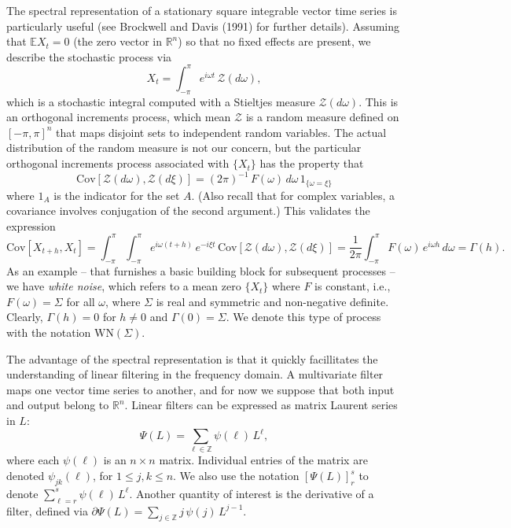 \documentclass[a4paper]{book}
\def\RR{\mathbb R}
\def\ZZ{\mathbb Z}
\def\EE{\mathbb E}
\begin{document}
 The spectral representation of a stationary square integrable vector 
time series is particularly useful (see Brockwell and Davis (1991) for 
 further details). Assuming that $\EE X_t = 0$ (the
 zero vector in $\RR^n$) so that no fixed effects are present, we describe
 the stochastic process via
\begin{equation}
\label{eq:specRep}
  X_t = \int_{-\pi}^{\pi} e^{i \omega t} \, \mathcal{Z} (d\omega),
\end{equation}
 which is a stochastic integral computed with a Stieltjes measure
 $\mathcal{Z} (d\omega)$.  This is an orthogonal increments process,
 which mean $\mathcal{Z}$ is a random measure defined on ${[-\pi,\pi]}^n$
 that maps disjoint sets to independent random variables.  The actual
 distribution of the random measure is not our concern, but the particular
 orthogonal increments process associated with $\{ X_t \}$ has the 
 property that
\[
  \mbox{Cov} [ \mathcal{Z} (d\omega), \mathcal{Z} (d\xi) ]
   = {(2 \pi)}^{-1} \, F (\omega) \, d\omega \, 1_{ \{   \omega = \xi \} }
\]
 where $1_A$ is the indicator for the set $A$.
  (Also recall that for complex variables, a 
covariance involves conjugation of
 the second argument.)  This validates the expression
\[
  \mbox{Cov} [ X_{t+h}, X_t ] =
 \int_{-\pi}^{\pi}  \int_{-\pi}^{\pi} e^{i \omega (t+h)} \,
  e^{-i \xi t } \, \mbox{Cov} [ \mathcal{Z} (d\omega), 
  \mathcal{Z} (d\xi) ] 
 =  \frac{1}{2 \pi} \int_{-\pi}^{\pi} F(\omega) \, e^{i \omega h}
  \, d\omega = \Gamma (h).
\]
 As an example -- that furnishes a basic building block for subsequent processes --
 we have {\em white noise}, which refers to a mean zero $\{ X_t \}$ where 
 $F$ is constant, i.e.,
 $F(\omega) = \Sigma$ for all $\omega$, where $\Sigma $ is real and symmetric and
 non-negative definite.  Clearly, $\Gamma (h) = 0$ for $h \neq 0$ and $\Gamma (0) = \Sigma$.
 We denote this type of process with the notation $\mbox{WN} (\Sigma)$.

 The advantage of the spectral representation is that it quickly facillitates
 the understanding of linear filtering in the frequency domain.
 A multivariate filter maps one vector time series to another, and for
 now we suppose that both input and output belong to $\RR^n$.
 Linear filters can be expressed as matrix Laurent series in $L$:
\[
 \Psi (L) = \sum_{\ell \in \ZZ} \psi (\ell) \, L^{\ell},
\]
 where each $\psi (\ell)$ is an $n \times n$ matrix.  
 Individual entries of the matrix are denoted $\psi_{jk} (\ell)$,
 for $1 \leq j, k \leq n$.   We also use the notation
  $ {[\Psi (L) ]}^{s}_r $ to denote $\sum_{\ell=r}^s
  \psi (\ell) \, L^{\ell}$. 
     Another quantity of interest is the derivative of a filter, 
  defined via $\partial \Psi (L) = \sum_{j \in \ZZ} j \, \psi(j) \, L^{j-1}$.
\end{document}
